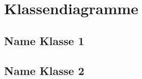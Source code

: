 \section{Klassendiagramme}
\label{app:Klassendiagramme}
\subsection{Name Klasse 1}

\newpage
\subsection{Name Klasse 2}
